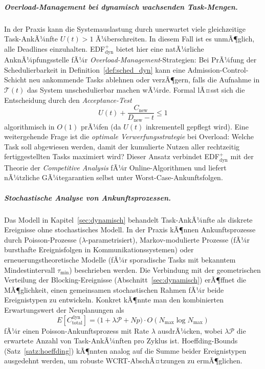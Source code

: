 ﻿\documentclass[a4paper,12pt]{article}
\theoremstyle{definition}
\begin{document}
	\subparagraph{Overload-Management bei dynamisch wachsenden Task-Mengen.}
	In der Praxis kann die Systemauslastung durch unerwartet viele gleichzeitige
	Task-AnkÃ¼nfte $U(t) > 1$ Ã¼berschreiten. In diesem Fall ist es unmÃ¶glich, alle
	Deadlines einzuhalten. EDF$^+_{\mathrm{dyn}}$ bietet hier eine natÃ¼rliche
	AnknÃ¼pfungsstelle fÃ¼r \emph{Overload-Management}-Strategien: Bei PrÃ¼fung der
	Schedulierbarkeit in Definition~\ref{def:sched_dyn} kann eine Admission-Control-Schicht
	neu ankommende Tasks ablehnen oder verzÃ¶gern, falls die Aufnahme in $\mathcal{T}(t)$
	das System unschedulierbar machen wÃ¼rde. Formal lÃ¤sst sich die Entscheidung durch
	den \emph{Acceptance-Test}
	\[
		U(t) + \frac{C_{\text{new}}}{D_{\text{new}} - t} \le 1
	\]
	algorithmisch in $O(1)$ prÃ¼fen (da $U(t)$ inkrementell gepflegt wird). Eine
	weitergehende Frage ist die \emph{optimale Verwerfungsstrategie} bei Overload:
	Welche Task soll abgewiesen werden, damit der kumulierte Nutzen aller rechtzeitig
	fertiggestellten Tasks maximiert wird? Dieser Ansatz verbindet EDF$^+_{\mathrm{dyn}}$
	mit der Theorie der \emph{Competitive Analysis} fÃ¼r Online-Algorithmen und
	liefert nÃ¼tzliche GÃ¼tegarantien selbst unter Worst-Case-Ankunftsfolgen.

	\subparagraph{Stochastische Analyse von Ankunftsprozessen.}
	Das Modell in Kapitel~\ref{sec:dynamisch} behandelt Task-AnkÃ¼nfte als diskrete
	Ereignisse ohne stochastisches Modell. In der Praxis kÃ¶nnen Ankunftsprozesse durch
	Poisson-Prozesse ($\lambda$-parametrisiert), Markov-modulierte Prozesse (fÃ¼r
	bursthafte Ereignisfolgen in Kommunikationssystemen) oder erneuerungstheoretische
	Modelle (fÃ¼r sporadische Tasks mit bekanntem Mindestintervall $\tau_{\min}$)
	beschrieben werden. Die Verbindung mit der geometrischen Verteilung der
	Blocking-Ereignisse (Abschnitt~\ref{sec:dynamisch}) erÃ¶ffnet die MÃ¶glichkeit,
	einen gemeinsamen stochastischen Rahmen fÃ¼r beide Ereignistypen zu entwickeln.
	Konkret kÃ¶nnte man den kombinierten Erwartungswert der Neuplanungen als
	\[
		E[C_{\mathrm{total}}^{\mathrm{dyn}}] = \bigl(1 + \lambda\mathcal{P} + Np\bigr)
		\cdot O(N_{\max}\log N_{\max})
	\]
	fÃ¼r einen Poisson-Ankunftsprozess mit Rate $\lambda$ ausdrÃ¼cken, wobei
	$\lambda\mathcal{P}$ die erwartete Anzahl von Task-AnkÃ¼nften pro Zyklus ist.
	Hoeffding-Bounds (Satz~\ref{satz:hoeffding}) kÃ¶nnten analog auf die Summe beider
	Ereignistypen ausgedehnt werden, um robuste WCRT-AbschÃ¤tzungen zu ermÃ¶glichen.
\end{document}
